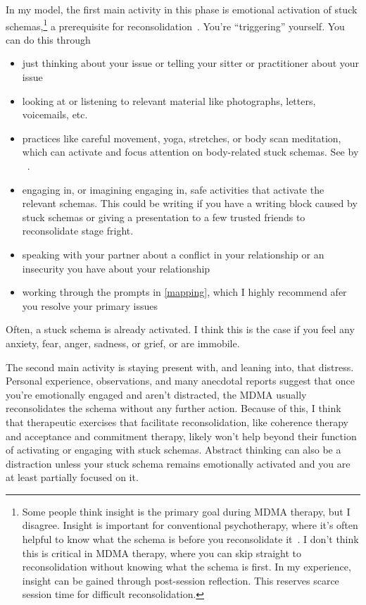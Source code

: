 \documentclass[11pt,oneside]{book}
\let\cite\parencite
\newcommand{\prosecite}[1]{\citetitle{#1} by \citefullauthor{#1}~\cite{#1}}
\begin{document}
In my model, the first main activity in this phase is emotional activation of stuck schemas,\footnote{Some people think insight is the primary goal during MDMA therapy, but I disagree. Insight is important for conventional psychotherapy, where it's often helpful to know what the schema is before you reconsolidate it~\cite{eckerUnlocking}. I don't think this is critical in MDMA therapy, where you can skip straight to reconsolidation without knowing what the schema is first. In my experience, insight can be gained through post-session reflection. This reserves scarce session time for difficult reconsolidation.} a prerequisite for reconsolidation~\cite{eckerUnlocking}. You're \enquote{triggering} yourself. You can do this through
\begin{itemize}
    \item just thinking about your issue or telling your sitter or practitioner about your issue
    \item looking at or listening to relevant material like photographs, letters, voicemails, etc.
    \item practices like careful movement, yoga, stretches, or body scan meditation, which can activate and focus attention on body-related stuck schemas. See \prosecite{bodyscan}.
    \item engaging in, or imagining engaging in, safe activities that activate the relevant schemas. This could be writing if you have a writing block caused by stuck schemas or giving a presentation to a few trusted friends to reconsolidate stage fright.
    \item speaking with your partner about a conflict in your relationship or an insecurity you have about your relationship~\cite{colbertEvenings}
    \item working through the prompts in \cref{mapping}, which I highly recommend afer you resolve your primary issues
\end{itemize}
Often, a stuck schema is already activated. I think this is the case if you feel any anxiety, fear, anger, sadness, or grief, or are immobile.

The second main activity is staying present with, and leaning into, that distress. Personal experience, observations, and many anecdotal reports suggest that once you're emotionally engaged and aren't distracted, the MDMA usually reconsolidates the schema without any further action. Because of this, I think that therapeutic exercises that facilitate reconsolidation, like coherence therapy and acceptance and commitment therapy, likely won't help beyond their function of activating or engaging with stuck schemas. Abstract thinking can also be a distraction unless your stuck schema remains emotionally activated and you are at least partially focused on it.
\end{document}

